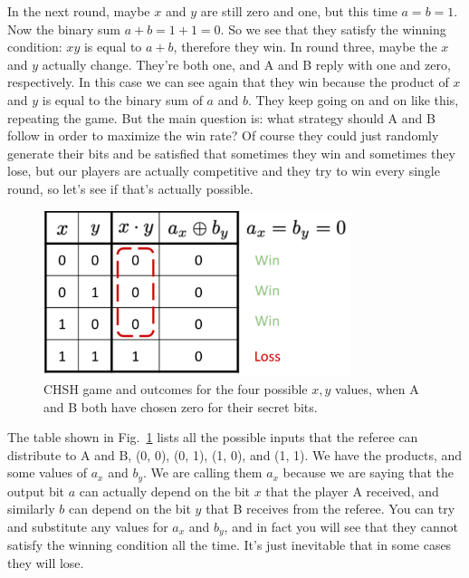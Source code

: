 In the next round, maybe $x$ and $y$ are still zero and one, but this time $a = b = 1$. Now the binary sum $a + b = 1 + 1 = 0$. So we see that they satisfy the winning condition: $xy$ is equal to $a + b$, therefore they win. In round three, maybe the $x$ and $y$ actually change. They're both one, and A and B reply with one and zero, respectively. In this case we can see again that they win because the product of $x$ and $y$ is equal to the binary sum of $a$ and $b$. They keep going on and on like this, repeating the game. But the main question is: what strategy should A and B follow in order to maximize the win rate? Of course they could just randomly generate their bits and be satisfied that sometimes they win and sometimes they lose, but our players are actually competitive and they try to win every single round, so let's see if that's actually possible.

\begin{figure}[H]
    \centering
    \includegraphics[width=0.8\textwidth]{lesson4/CHSH_annotated_table.pdf}
        \caption[CHSH game and outcomes]{CHSH game and outcomes for the four possible $x, y$ values, when A and B both have chosen zero for their secret bits.}
    \label{fig:chsh-table}
\end{figure}

The table shown in Fig.~\ref{fig:chsh-table} lists all the possible inputs that the referee can distribute to A and B, (0, 0), (0, 1), (1, 0), and (1, 1). We have the products, and some values of $a_x$ and $b_y$. We are calling them $a_x$ because we are saying that the output bit $a$ can actually depend on the bit $x$ that the player A received, and similarly $b$ can depend on the bit $y$ that B receives from the referee. You can try and substitute any values for $a_x$ and $b_y$, and in fact you will see that they cannot satisfy the winning condition all the time. It's just inevitable that in some cases they will lose.

